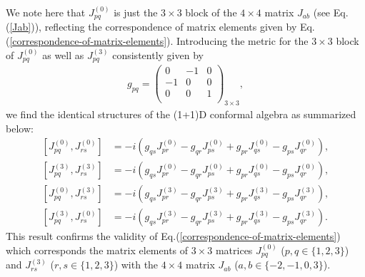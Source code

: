 \documentclass[%
 reprint,
superscriptaddress,
 amsmath,amssymb,
 aps,
]{revtex4-2}
\begin{document}
We note here that $J^{(0)}_{p q}$ is just the $3\times3$ block of the $4\times4$ matrix $J_{ab}$ (see Eq.(\ref{Jab})), reflecting the correspondence of matrix elements given by Eq.(\ref{correspondence-of-matrix-elements}).   
Introducing the metric for the $3\times3$ block of $J^{(0)}_{p q}$ as well as $J^{(3)}_{p q}$ consistently given by   
\begin{align}
      g_{pq}=\begin{pmatrix}
  0&-1&0\\
  -1&0&0\\
  0&0&1\\
  \end{pmatrix}_{3\times3},
  \end{align}
we find the identical structures of the (1+1)D conformal algebra
as summarized below:
\begin{align}
      \left[J^{(0)}_{{p}{q}},J^{(0)}_{{r}{s}}\right]&=-i\left(g_{{q}{s}}J^{(0)}_{{p}{r}}-g_{{q}{r}}J^{(0)}_{{p}{s}}+g_{{p}{r}}J^{(0)}_{{q}{s}}-g_{{p}{s}}J^{(0)}_{{q}{r}}\right),\\
      \left[J^{(3)}_{{p}{q}},J^{(3)}_{{r}{s}}\right]&=-i\left(g_{{q}{s}}J^{(0)}_{{p}{r}}-g_{{q}{r}}J^{(0)}_{{p}{s}}+g_{{p}{r}}J^{(0)}_{{q}{s}}-g_{{p}{s}}J^{(0)}_{{q}{r}}\right),\\
      \left[J^{(0)}_{{p}{q}},J^{(3)}_{{r}{s}}\right]&=-i\left(g_{{q}{s}}J^{(3)}_{{p}{r}}-g_{{q}{r}}J^{(3)}_{{p}{s}}+g_{{p}{r}}J^{(3)}_{{q}{s}}-g_{{p}{s}}J^{(3)}_{{q}{r}}\right),\\
      \left[J^{(3)}_{{p}{q}},J^{(0)}_{{r}{s}}\right]&=-i\left(g_{{q}{s}}J^{(3)}_{{p}{r}}-g_{{q}{r}}J^{(3)}_{{p}{s}}+g_{{p}{r}}J^{(3)}_{{q}{s}}-g_{{p}{s}}J^{(3)}_{{q}{r}}\right).
  \end{align}
This result confirms the validity of Eq.(\ref{correspondence-of-matrix-elements}) which corresponds the matrix elements of $3\times3$ matrices
 $J^{(0)}_{pq}$ ($p,q\in\{1,2,3\}$) and $J^{(3)}_{rs}$ ($r,s\in\{1,2,3\}$) with the $4\times4$ matrix $J_{ab}$ ($a,b\in\{-2,-1,0,3\}$).
\end{document}

